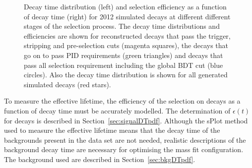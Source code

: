 \begin{figure}[tbp]
\begin{subfigure}[b]{0.48\textwidth}
   \end{subfigure}
    \caption{Decay time distribution (left) and selection efficiency as a function of decay time (right) for 2012 \bsmumu simulated decays at different different stages of the selection process. The decay time distributions and efficiencies are shown for reconstructed decays that pass the trigger, stripping and pre-selection cuts (magenta squares), the decays that go on to pass PID requirements (green triangles) and decays that pass all selection requirement including the global BDT cut (blue circles). Also the decay time distribution is shown for all generated simulated decays (red stars).} %
    \label{fig:accpteg}
\end{figure}

To measure the \bsmumu effective lifetime, the efficiency of the selection on \bsmumu decays as a function of decay time must be accurately modelled. The determination of $\epsilon(t)$ for \bsmumu decays is described in Section~\ref{sec:signalDTpdf}. Although the sPlot method used to measure the \bsmumu effective lifetime means that the decay time \pdfs of the backgrounds present in the data set are not needed, realistic  descriptions of the background decay time \pdfs are necessary for optimising the mass fit configuration. The background \pdfs used are described in Section~\ref{sec:bkgDTpdf}.


